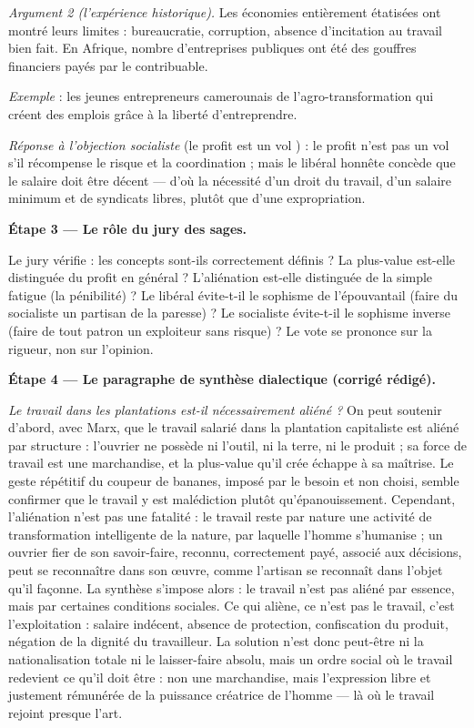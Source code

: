 \documentclass[11pt]{article}
\newcommand{\cle}[1]{{\popxbold\color{popdark}#1}}
\begin{document}
\begin{exoresolu}
\emph{Argument 2 (l'expérience historique).} Les économies entièrement étatisées ont montré leurs limites : bureaucratie, corruption, absence d'incitation au travail bien fait. En Afrique, nombre d'entreprises publiques ont été des gouffres financiers payés par le contribuable.

\emph{Exemple} : les jeunes entrepreneurs camerounais de l'agro-transformation qui créent des emplois grâce à la liberté d'entreprendre.

\emph{Réponse à l'objection socialiste} (\guillemotleft le profit est un vol \guillemotright) : le profit n'est pas un vol s'il récompense le risque et la coordination ; mais le libéral honnête concède que le salaire doit être décent — d'où la nécessité d'un droit du travail, d'un salaire minimum et de syndicats libres, plutôt que d'une expropriation.

\textbf{Étape 3 — Le rôle du jury des sages.}

Le jury vérifie : les concepts sont-ils correctement définis ? La plus-value est-elle distinguée du profit en général ? L'aliénation est-elle distinguée de la simple fatigue (la \cle{pénibilité}) ? Le libéral évite-t-il le sophisme de l'épouvantail (faire du socialiste un partisan de la paresse) ? Le socialiste évite-t-il le sophisme inverse (faire de tout patron un exploiteur sans risque) ? Le vote se prononce sur la rigueur, non sur l'opinion.

\textbf{Étape 4 — Le paragraphe de synthèse dialectique (corrigé rédigé).}

\emph{Le travail dans les plantations est-il nécessairement aliéné ?} On peut soutenir d'abord, avec Marx, que le travail salarié dans la plantation capitaliste est aliéné par structure : l'ouvrier ne possède ni l'outil, ni la terre, ni le produit ; sa force de travail est une marchandise, et la plus-value qu'il crée échappe à sa maîtrise. Le geste répétitif du coupeur de bananes, imposé par le besoin et non choisi, semble confirmer que le travail y est malédiction plutôt qu'épanouissement. Cependant, l'aliénation n'est pas une fatalité : le travail reste par nature une activité de transformation intelligente de la nature, par laquelle l'homme s'humanise ; un ouvrier fier de son savoir-faire, reconnu, correctement payé, associé aux décisions, peut se reconnaître dans son œuvre, comme l'artisan se reconnaît dans l'objet qu'il façonne. La synthèse s'impose alors : le travail n'est pas aliéné par essence, mais par certaines conditions sociales. Ce qui aliène, ce n'est pas le travail, c'est l'exploitation : salaire indécent, absence de protection, confiscation du produit, négation de la dignité du travailleur. La solution n'est donc peut-être ni la nationalisation totale ni le laisser-faire absolu, mais un ordre social où le travail redevient ce qu'il doit être : non une marchandise, mais l'expression libre et justement rémunérée de la puissance créatrice de l'homme — là où le travail rejoint presque l'art.
\end{exoresolu}
\end{document}
